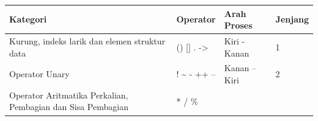 \begin{longtable}[]{@{}llll@{}}
\toprule
\begin{minipage}[b]{0.52\columnwidth}\raggedright\strut
Kategori
\strut\end{minipage} &
\begin{minipage}[b]{0.17\columnwidth}\raggedright\strut
Operator
\strut\end{minipage} &
\begin{minipage}[b]{0.14\columnwidth}\raggedright\strut
Arah Proses
\strut\end{minipage} &
\begin{minipage}[b]{0.05\columnwidth}\raggedright\strut
Jenjang
\strut\end{minipage}\tabularnewline
\midrule
\endhead
\begin{minipage}[t]{0.52\columnwidth}\raggedright\strut
Kurung, indeks larik dan elemen struktur data
\strut\end{minipage} &
\begin{minipage}[t]{0.17\columnwidth}\raggedright\strut
() {[}{]} . -\textgreater{}
\strut\end{minipage} &
\begin{minipage}[t]{0.14\columnwidth}\raggedright\strut
Kiri - Kanan
\strut\end{minipage} &
\begin{minipage}[t]{0.05\columnwidth}\raggedright\strut
1
\strut\end{minipage}\tabularnewline
\begin{minipage}[t]{0.52\columnwidth}\raggedright\strut
Operator Unary
\strut\end{minipage} &
\begin{minipage}[t]{0.17\columnwidth}\raggedright\strut
! \textasciitilde{} - ++ --
\strut\end{minipage} &
\begin{minipage}[t]{0.14\columnwidth}\raggedright\strut
Kanan -- Kiri
\strut\end{minipage} &
\begin{minipage}[t]{0.05\columnwidth}\raggedright\strut
2
\strut\end{minipage}\tabularnewline
\begin{minipage}[t]{0.52\columnwidth}\raggedright\strut
Operator Aritmatika Perkalian, Pembagian dan Sisa Pembagian
\strut\end{minipage} &
\begin{minipage}[t]{0.17\columnwidth}\raggedright\strut
* / \%
\strut\end{minipage} &

\end{longtable}
